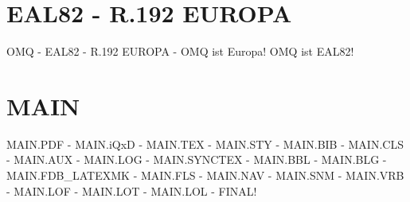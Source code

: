 \documentclass{MAIN}
\begin{document}
\maketitle
\section*{EAL82 - R.192 EUROPA}
OMQ - EAL82 - R.192 EUROPA - OMQ ist Europa! OMQ ist EAL82!
\section*{MAIN}
MAIN.PDF - MAIN.iQxD - MAIN.TEX - MAIN.STY - MAIN.BIB - MAIN.CLS - MAIN.AUX - MAIN.LOG - MAIN.SYNCTEX - MAIN.BBL - MAIN.BLG - MAIN.FDB_LATEXMK - MAIN.FLS - MAIN.NAV - MAIN.SNM - MAIN.VRB - MAIN.LOF - MAIN.LOT - MAIN.LOL - FINAL!
\cite{omq_eal82}

\end{document}
